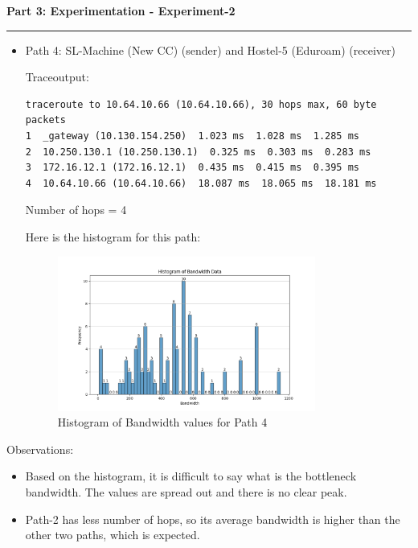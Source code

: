 \documentclass[a4paper,12pt]{article}
\newenvironment{solution}[2][]{%
    \begin{mdframed}[linecolor=blue!70!black, linewidth=2pt, roundcorner=10pt, backgroundcolor=yellow!10!white, skipabove=12pt, skipbelow=12pt]%
        \textbf{\large #2}
        \par\noindent\rule{\textwidth}{0.4pt}
}{
    \end{mdframed}
}
\begin{document}
\begin{solution}{Part 3: Experimentation - Experiment-2}
\begin{itemize}
\item Path 4: SL-Machine (New CC) (sender) and Hostel-5 (Eduroam) (receiver)

        Traceoutput:
        \begin{verbatim}
traceroute to 10.64.10.66 (10.64.10.66), 30 hops max, 60 byte packets
1  _gateway (10.130.154.250)  1.023 ms  1.028 ms  1.285 ms
2  10.250.130.1 (10.250.130.1)  0.325 ms  0.303 ms  0.283 ms
3  172.16.12.1 (172.16.12.1)  0.435 ms  0.415 ms  0.395 ms
4  10.64.10.66 (10.64.10.66)  18.087 ms  18.065 ms  18.181 ms      
\end{verbatim}   
Number of hops = 4

Here is the histogram for this path:
\begin{figure}[H]
    \centering
    \includegraphics[width=0.8\textwidth]{histograms/part3-e2-my-room-sl-buffer_bandwidth_histogram.png}
    \caption{Histogram of Bandwidth values for Path 4}
\end{figure}
\end{itemize}



Observations:
\begin{itemize}
    \item Based on the histogram, it is difficult to say what is the bottleneck bandwidth. The values are spread out and there is no clear peak.
    \item Path-2 has less number of hops, so its average bandwidth is higher than the other two paths, which is expected.
\end{itemize}

\end{solution}
\end{document}
